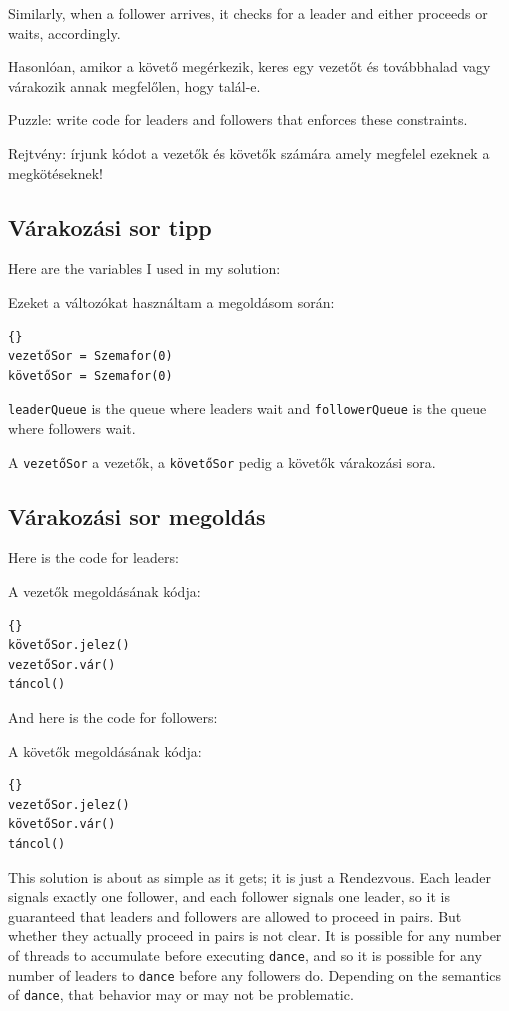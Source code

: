 \documentclass{book}
\newcommand{\clearemptydoublepage}{\newpage\cleardoublepage}
\begin{document}
Similarly, when a follower arrives, it checks for a leader and
either proceeds or waits, accordingly.

Hasonlóan, amikor a követő megérkezik, keres egy vezetőt és
továbbhalad vagy várakozik annak megfelőlen, hogy talál-e.

Puzzle: write code for leaders and followers that enforces these
constraints.

Rejtvény: írjunk kódot a vezetők és követők számára amely
megfelel ezeknek a megkötéseknek!


\clearemptydoublepage
\subsection {Várakozási sor tipp}

Here are the variables I used in my solution:

Ezeket a változókat használtam a megoldásom során:

\begin{lstlisting}[title={Várakozási sor tipp}]{}
vezetőSor = Szemafor(0)
követőSor = Szemafor(0)
\end{lstlisting}

{\tt leaderQueue} is the queue where leaders wait 
and {\tt followerQueue} is the queue where followers wait.

A {\tt vezetőSor} a vezetők, a {\tt követőSor} pedig
a követők várakozási sora.

\clearemptydoublepage
\subsection {Várakozási sor megoldás}

Here is the code for leaders:

A vezetők megoldásának kódja:

\begin{lstlisting}[title={Várakozási sor megoldás (vezetők)}]{}
követőSor.jelez()
vezetőSor.vár()
táncol()
\end{lstlisting}

And here is the code for followers:

A követők megoldásának kódja:

\begin{lstlisting}[title={Várakozási sor megoldás (követők)}]{}
vezetőSor.jelez()
követőSor.vár()
táncol()
\end{lstlisting}

This solution is about as simple as it gets; it is just a Rendezvous.
Each leader signals exactly one follower, and each follower signals
one leader, so it is guaranteed that leaders and followers are
allowed to proceed in pairs.  But whether they actually proceed in
pairs is not clear.  It is possible for any number of threads to
accumulate before executing {\tt dance}, and so it is possible for
any number of leaders to {\tt dance} before any followers do.
Depending on the semantics of {\tt dance}, that behavior may or
may not be problematic.
\end{document}
